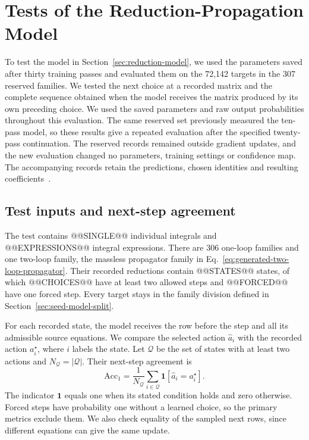 \section{Tests of the Reduction-Propagation Model}
\label{sec:reduction-test}
To test the model in Section~\ref{sec:reduction-model}, we used the
parameters saved after thirty training passes and evaluated them on
the 72,142 targets in the 307 reserved families. We tested
the next choice at a recorded matrix and the complete sequence obtained
when the model receives the matrix produced by its own preceding choice.
We used the saved parameters and raw output probabilities throughout
this evaluation. The same reserved set previously measured the
ten-pass model, so these results give a repeated evaluation after the
specified twenty-pass continuation. The reserved records remained
outside gradient updates, and the new evaluation changed no parameters,
training settings or confidence map.
The accompanying records retain the predictions, chosen identities
and resulting coefficients~\cite{ReductionModelTestData}.

\subsection{Test inputs and next-step agreement}
The test contains @@SINGLE@@ individual integrals and @@EXPRESSIONS@@
integral expressions. There are 306 one-loop families and one two-loop
family, the massless propagator family in
Eq.~\eqref{eq:generated-two-loop-propagator}. Their recorded reductions
contain @@STATES@@ states, of which @@CHOICES@@ have at least two
allowed steps and @@FORCED@@ have one forced step. Every target stays
in the family division defined in Section~\ref{sec:seed-model-split}.

For each recorded state, the model receives the row before the step
and all its admissible source equations. We compare the selected
action $\widehat a_i$ with the recorded action $a_i^\star$, where $i$
labels the state. Let $\mathcal Q$ be the set of states with at least
two actions and $N_{\mathcal Q}=|\mathcal Q|$. Their next-step agreement is
\begin{equation}
 \mathrm{Acc}_{1}=\frac{1}{N_{\mathcal Q}}
       \sum_{i\in\mathcal Q}\mathbf1[\widehat a_i=a_i^\star].
 \label{eq:reduction-test-agreement}
\end{equation}
The indicator $\mathbf1$ equals one when its stated condition holds
and zero otherwise. Forced steps have probability one without a learned
choice, so the primary metrics exclude them. We also check equality of
the sampled next rows, since different equations can give the same update.

